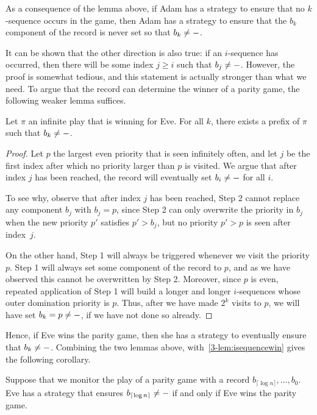 As a consequence of the lemma above, if Adam has a strategy to ensure that no
$k$-sequence occurs in the game, then Adam has a strategy to ensure that the
$b_k$ component of the record is never set so that $b_k \ne \mathtt{-}$.

It can be shown that the other direction is also true: if an $i$-sequence has
occurred, then there will be some index $j \ge i$ such that $b_j \ne \mathtt{-}$.
However, the proof is somewhat tedious, and this statement is actually stronger
than what we need. To argue that the record can determine the winner of a parity
game, the following weaker lemma suffices. 

\begin{lemma}
Let $\pi$ an infinite play that is winning for Eve. For all $k$, there exists
a prefix of $\pi$ such that $b_k \ne \mathtt{-}$.
\end{lemma}
\begin{proof}
Let $p$ the largest even priority that is seen infinitely often, and let $j$
be the first index after which no priority larger than $p$ is visited. We argue
that after index $j$ has been reached, the record will eventually set $b_i \ne
\mathtt{-}$ for all $i$.

To see why, observe that after index $j$ has been reached, Step 2 cannot replace
any component $b_j$ with $b_j = p$, since Step 2 can only overwrite the priority
in $b_j$ when the new priority $p'$ satisfies $p' > b_j$, but no priority $p' >
p$ is seen after index~$j$. 

On the other hand, Step 1 will always be triggered whenever we visit the
priority $p$. Step 1 will always set some component of the record to $p$, and as
we have observed this cannot be overwritten by Step 2. Moreover, since $p$ is
even, repeated application of Step 1 will
build a longer and longer $i$-sequences whose outer domination
priority is $p$. Thus, after we have made $2^k$ visits to $p$, we will have set
$b_k = p \ne \mathtt{-}$, if we have not done so already.
\end{proof}

Hence, if Eve wins the parity game, then she has a strategy to eventually ensure
that $b_k \ne \mathtt{-}$. Combining the two lemmas above, with~\cref{3-lem:isequencewin} gives the following corollary.

\begin{corollary}
Suppose that we monitor the play of a parity game with a record $b_{\lceil \log
n \rceil}, \dots, b_0$. Eve has a strategy that ensures $b_{\lceil \log n
\rceil} \ne \mathtt{-}$ if and only if Eve wins the parity game.
\end{corollary}

